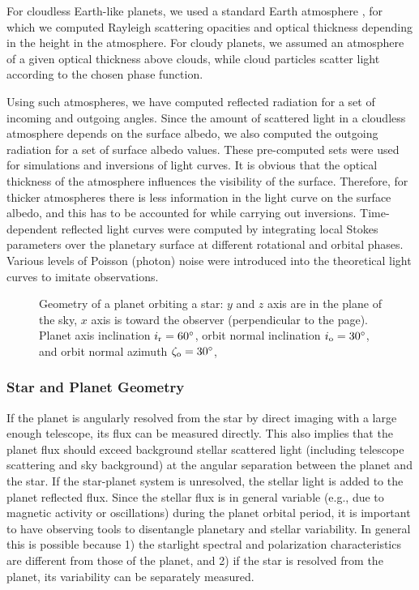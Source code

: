 \documentclass{emulateapj}
\begin{document}
For cloudless Earth-like planets, we used a standard Earth atmosphere \citep{McCl72},
for which we computed Rayleigh scattering opacities and optical thickness depending
in the height in the atmosphere.
For cloudy planets, we assumed an atmosphere of a given optical thickness 
above clouds, while cloud particles scatter light according to the chosen phase function.

Using such atmospheres, we have computed reflected radiation
for a set of incoming and outgoing angles. 
Since the amount of scattered light in a cloudless atmosphere depends on the surface albedo,
we also computed the outgoing radiation for a set of surface albedo values.
These pre-computed sets were used for simulations and inversions of light curves.
It is obvious that the optical thickness of the atmosphere influences the visibility
of the surface. Therefore, for thicker atmospheres there is less information in the
light curve on the surface albedo, and this has to be accounted for while carrying out inversions.
Time-dependent reflected light curves were computed by integrating local Stokes parameters 
over the planetary surface at different rotational and orbital phases. 
Various levels of Poisson (photon) noise were introduced into the theoretical light curves 
to imitate observations. 

\begin{figure}
\caption{Geometry of a planet orbiting a star: $y$ and $z$ axis are in the plane of the sky, 
$x$ axis is toward the observer (perpendicular to the page).
 Planet axis inclination $i_{\rm r}=60^\circ$,
 orbit normal inclination $i_{\rm o}=30^\circ$, and
 orbit normal azimuth $\zeta_{\rm o}=30^\circ$, 
 }
\label{fig:geom}
\end{figure}

\subsubsection{Star and Planet Geometry}\label{sec:dmod_geom}

If the planet is angularly resolved from the star by direct imaging with a large enough telescope, 
its flux can be measured directly. This also implies that the planet flux should exceed background stellar 
scattered light (including telescope scattering and sky background) at the angular separation 
between the planet and the star. 
If the star-planet system is unresolved, the stellar light is added to the planet 
reflected flux. Since the stellar flux is in general variable (e.g., due to magnetic activity 
or oscillations) during the planet orbital period, it is important to have observing tools
to disentangle planetary and stellar variability. In general this is possible because 
1) the starlight spectral and polarization characteristics are different from those of the planet, 
and 2) if the star is resolved from the planet, its variability can be separately measured.
\end{document}
